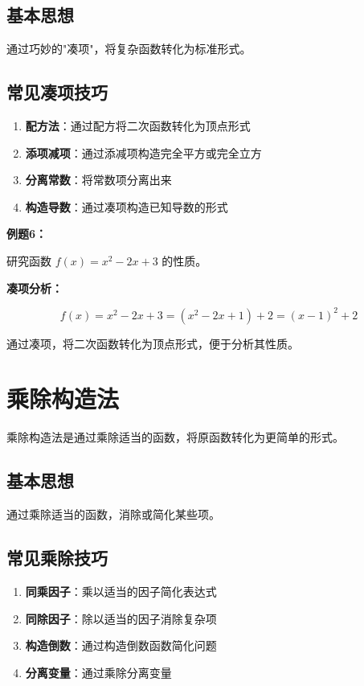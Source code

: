 \documentclass[a4paper,11pt]{ctexrep}
\newcommand{\exampleicon}{\ModeBadge[highlight]{例题}}
\newcommand{\analysisicon}{\ModeBadge[secondary]{分析}}
\theoremstyle{definition}
\begin{document}
\subsection{基本思想}

通过巧妙的"凑项"，将复杂函数转化为标准形式。

\subsection{常见凑项技巧}

\begin{tipbox}[凑项技巧]
\begin{enumerate}
    \item \textbf{配方法}：通过配方将二次函数转化为顶点形式
    \item \textbf{添项减项}：通过添减项构造完全平方或完全立方
    \item \textbf{分离常数}：将常数项分离出来
    \item \textbf{构造导数}：通过凑项构造已知导数的形式
\end{enumerate}
\end{tipbox}

\exampleicon \textbf{例题6：}

研究函数 $f(x) = x^2 - 2x + 3$ 的性质。

\analysisicon \textbf{凑项分析：}

$$f(x) = x^2 - 2x + 3 = (x^2 - 2x + 1) + 2 = (x-1)^2 + 2$$

通过凑项，将二次函数转化为顶点形式，便于分析其性质。

\section{乘除构造法}

乘除构造法是通过乘除适当的函数，将原函数转化为更简单的形式。

\subsection{基本思想}

通过乘除适当的函数，消除或简化某些项。

\subsection{常见乘除技巧}

\begin{methodbox}[乘除构造技巧]
\begin{enumerate}
    \item \textbf{同乘因子}：乘以适当的因子简化表达式
    \item \textbf{同除因子}：除以适当的因子消除复杂项
    \item \textbf{构造倒数}：通过构造倒数函数简化问题
    \item \textbf{分离变量}：通过乘除分离变量
\end{enumerate}
\end{methodbox}
\end{document}
